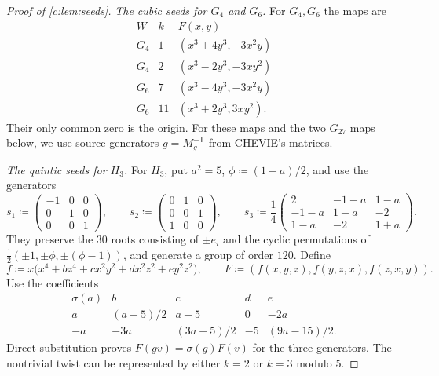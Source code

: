 \documentclass[11pt]{amsart}
\newcommand{\defeq}{\coloneqq}
\theoremstyle{definition}
\begin{document}
\begin{proof}[Proof of \cref{c:lem:seeds}]
\emph{The cubic seeds for $G_4$ and $G_6$.}
For $G_4,G_6$ the maps are
\[
\begin{array}{c|c|c}
 W&k&F(x,y)\\\hline
 G_4&1&(x^3+4y^3,-3x^2y)\\
 G_4&2&(x^3-2y^3,-3xy^2)\\
 G_6&7&(x^3-4y^3,-3x^2y)\\
 G_6&11&(x^3+2y^3,3xy^2).
\end{array}
\]
Their only common zero is the origin. For these maps and the two
$G_{27}$ maps below, we use source generators $g=M_g^{-\mathsf T}$
from CHEVIE's matrices.

\emph{The quintic seeds for $H_3$.}
For $H_3$, put $a^2=5$, $\phi\defeq(1+a)/2$, and use the generators
\[
 s_1\defeq\begin{pmatrix}-1&0&0\\0&1&0\\0&0&1\end{pmatrix},\qquad
 s_2\defeq\begin{pmatrix}0&1&0\\0&0&1\\1&0&0\end{pmatrix},\qquad
 s_3\defeq\frac14\begin{pmatrix}
 2&-1-a&1-a\\
 -1-a&1-a&-2\\
 1-a&-2&1+a
 \end{pmatrix}.
\]
They preserve the $30$ roots consisting of $\pm e_i$ and the cyclic
permutations of $\tfrac12(\pm1,\pm\phi,\pm(\phi-1))$, and generate
a group of order $120$. Define
\[
 f\defeq x\bigl(x^4+bz^4+cx^2y^2+dx^2z^2+ey^2z^2\bigr),
 \qquad F\defeq(f(x,y,z),f(y,z,x),f(z,x,y)).
\]
Use the coefficients
\[
\begin{array}{c|rrrr}
 \sigma(a)&b&c&d&e\\\hline
 a&(a+5)/2&a+5&0&-2a\\
 -a&-3a&(3a+5)/2&-5&(9a-15)/2.
\end{array}
\]
Direct substitution proves $F(gv)=\sigma(g)F(v)$ for the three generators.
The nontrivial twist can be represented by either $k=2$ or $k=3$
modulo $5$.


\end{proof}
\end{document}
